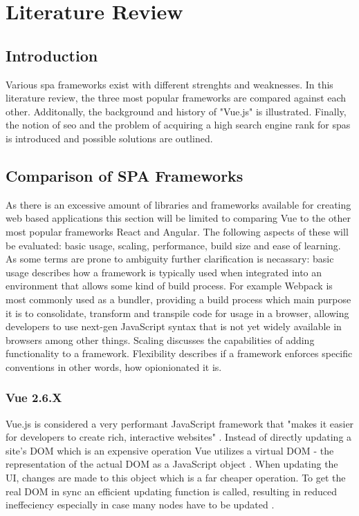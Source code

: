 \chapter[Literature Review]{Literature Review}

\section{Introduction}
Various \acrfull{spa} frameworks exist with different strenghts and weaknesses. In this literature review, the three most popular frameworks are compared against each other. Additonally, the background and history of "Vue.js" is illustrated. Finally, the notion of \acrfull{seo} and the problem of acquiring a high search engine rank for \acrshort{spa}s is introduced and possible solutions are outlined.

\section{Comparison of SPA Frameworks}
As there is an excessive amount of libraries and frameworks available for creating web based applications this section will be limited to comparing Vue to the other most popular frameworks React and Angular. The following aspects of these will be evaluated: basic usage, scaling, performance, build size and ease of learning. As some terms are prone to ambiguity further clarification is necassary: basic usage describes how a framework is typically used when integrated into an environment that allows some kind of build process. For example Webpack is most commonly used as a bundler, providing a build process which main purpose it is to consolidate, transform and transpile code for usage in a browser, allowing developers to use next-gen JavaScript syntax that is not yet widely available in browsers among other things. Scaling discusses the capabilities of adding functionality to a framework. Flexibility describes if a framework enforces specific conventions in other words, how opionionated it is.

\subsection{Vue 2.6.X}
Vue.js is considered a very performant JavaScript framework that "makes it easier for developers to create rich, interactive websites" \cite{macrae2018vue}. Instead of directly updating a site's \gls{DOM} which is an expensive operation Vue utilizes a virtual DOM \cite{ComparisonVue:online} - the representation of the actual DOM as a JavaScript object \cite{WhatIsVirtualDom:online}. When updating the UI, changes are made to this object which is a far cheaper operation. To get the real DOM in sync an efficient updating function is called, resulting in reduced ineffeciency especially in case many nodes have to be updated \cite{WhatIsVirtualDom:online}.

